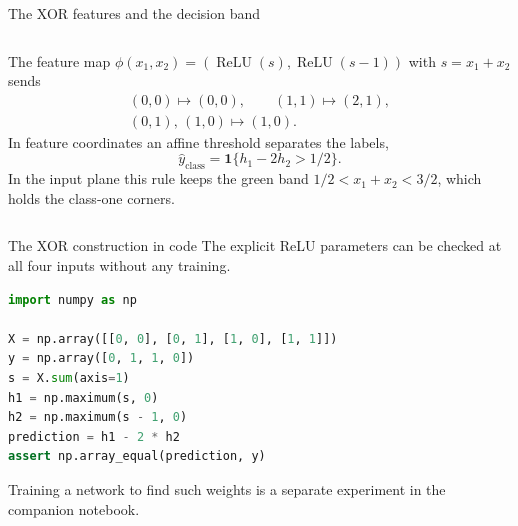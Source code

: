 \documentclass[aspectratio=169]{beamer}
\DeclareMathOperator{\ReLU}{ReLU}
\begin{document}
\begin{frame}{The XOR features and the decision band}
\begin{columns}[T]
The feature map $\phi(x_1,x_2)=(\ReLU(s),\ReLU(s-1))$ with $s=x_1+x_2$ sends
\[
\begin{gathered}
(0,0)\mapsto(0,0),\qquad (1,1)\mapsto(2,1),\\
(0,1),\,(1,0)\mapsto(1,0).
\end{gathered}
\]
In feature coordinates an affine threshold separates the labels,
\[
\hat y_{\text{class}}=\mathbf 1\{h_1-2h_2>1/2\}.
\]
In the input plane this rule keeps the green band $1/2<x_1+x_2<3/2$, which holds the class-one corners.
\end{columns}
\end{frame}

\begin{frame}[fragile]{The XOR construction in code}
The explicit ReLU parameters can be checked at all four inputs without any training.
\begin{lstlisting}[language=Python]
import numpy as np

X = np.array([[0, 0], [0, 1], [1, 0], [1, 1]])
y = np.array([0, 1, 1, 0])
s = X.sum(axis=1)
h1 = np.maximum(s, 0)
h2 = np.maximum(s - 1, 0)
prediction = h1 - 2 * h2
assert np.array_equal(prediction, y)
\end{lstlisting}
Training a network to find such weights is a separate experiment in the companion notebook.
\end{frame}
\end{document}
